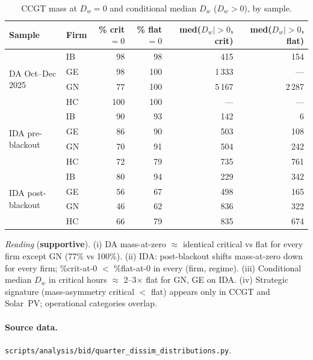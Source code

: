 \documentclass[11pt,a4paper]{article}
\newcommand{\code}[1]{\nolinkurl{#1}}
\begin{document}
\begin{table}[H]
\centering
\caption{CCGT mass at $D_w = 0$ and conditional median $D_w$ ($D_w > 0$), by sample.}
\label{tab:dw_mass_median}
\begin{tabular}{l l r r r r}
\toprule
Sample & Firm & \% crit $= 0$ & \% flat $= 0$ & med($D_w \mid > 0$, crit) & med($D_w \mid > 0$, flat) \\
\midrule
\multirow{4}{*}{DA Oct--Dec 2025} & IB &  98 &  98 &   415 &   154 \\
                                  & GE &  98 & 100 & 1\,333 &  --- \\
                                  & GN &  77 & 100 & 5\,167 & 2\,287 \\
                                  & HC & 100 & 100 &  ---  &  --- \\
\midrule
\multirow{4}{*}{IDA pre-blackout} & IB &  90 &  93 &  142 &     6 \\
                                  & GE &  86 &  90 &  503 &   108 \\
                                  & GN &  70 &  91 &  504 &   242 \\
                                  & HC &  72 &  79 &  735 &   761 \\
\midrule
\multirow{4}{*}{IDA post-blackout}& IB &  80 &  94 &  229 &   342 \\
                                  & GE &  56 &  67 &  498 &   165 \\
                                  & GN &  46 &  62 &  836 &   322 \\
                                  & HC &  66 &  79 &  835 &   674 \\
\bottomrule
\end{tabular}
\end{table}

\textit{Reading} (\textbf{supportive}). (i) DA mass-at-zero $\approx$ identical critical vs flat for every firm except GN (77\% vs 100\%). (ii) IDA: post-blackout shifts mass-at-zero down for every firm; \%crit-at-0 $<$ \%flat-at-0 in every (firm, regime). (iii) Conditional median $D_w$ in critical hours $\approx$ 2--3$\times$ flat for GN, GE on IDA. (iv) Strategic signature (mass-asymmetry critical $<$ flat) appears only in CCGT and Solar~PV; operational categories overlap.

\paragraph{Source data.}
\code{scripts/analysis/bid/quarter_dissim_distributions.py}.
\end{document}

